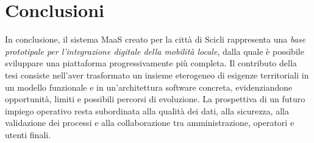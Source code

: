 \section{Conclusioni}
In conclusione, il sistema MaaS creato per la città di Scicli rappresenta una \emph{base prototipale per l'integrazione digitale della mobilità locale}, dalla quale è possibile sviluppare una piattaforma progressivamente più completa. Il contributo della tesi consiste nell'aver trasformato un insieme eterogeneo di esigenze territoriali in un modello funzionale e in un'architettura software concreta, evidenziandone opportunità, limiti e possibili percorsi di evoluzione. La prospettiva di un futuro impiego operativo resta subordinata alla qualità dei dati, alla sicurezza, alla validazione dei processi e alla collaborazione tra amministrazione, operatori e utenti finali.

